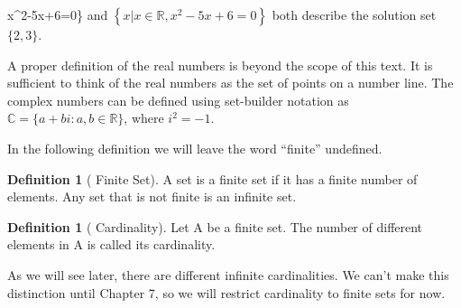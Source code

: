 \documentclass[10pt,]{book}
\theoremstyle{plain}
\theoremstyle{definition}
\newtheorem{definition}[theorem]{Definition}
\theoremstyle{definition}
\theoremstyle{definition}
\theoremstyle{definition}
\numberwithin{equation}{section}
\begin{document}
 \mid x^{2}-5x+6=0\right\}\) and \(\left\{x \lvert  x\in \mathbb{R}, x^{2 }-5x+6=0\right\}\) both describe the solution set \(\{2, 3\}\). 
%
\par
A proper definition of the real numbers is beyond the scope of this text. It is sufficient to think of the real numbers as the set of points on a
number line. The complex numbers can be defined using set-builder notation as \(\mathbb{C} = \{a + b i:a, b \in \mathbb{R}\}\), where \(i^2 = -1\).  %
\par
In the following definition we will leave the word ``finite'' undefined.   
%
\begin{definition}[ Finite Set]\label{finite-set}
A set is a finite set if it has a finite number of elements. Any set that is not finite is an infinite set.%
\end{definition}
\begin{definition}[ Cardinality]\label{cardinality.}
\label{notation-3}
Let A be a finite set. The number of different elements in A is called its cardinality.%
\end{definition}
\par
As we will see later, there are different infinite cardinalities. We can't make this distinction until Chapter 7, so we will restrict cardinality to finite sets for now.%
\typeout{************************************************}
\typeout{************************************************}
\end{document}

